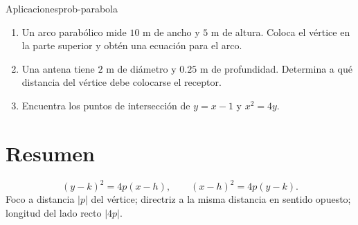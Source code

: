\begin{problem}{Aplicaciones}{prob-parabola}
\begin{enumerate}
  \item Un arco parabólico mide $10$ m de ancho y $5$ m de altura. Coloca el
  vértice en la parte superior y obtén una ecuación para el arco.
  \item Una antena tiene $2$ m de diámetro y $0.25$ m de profundidad.
  Determina a qué distancia del vértice debe colocarse el receptor.
  \item Encuentra los puntos de intersección de $y=x-1$ y $x^2=4y$.
\end{enumerate}
\end{problem}

\section*{Resumen}
\begin{properties}
\[
(y-k)^2=4p(x-h),\qquad (x-h)^2=4p(y-k).
\]
Foco a distancia $|p|$ del vértice; directriz a la misma distancia en sentido
opuesto; longitud del lado recto $|4p|$.
\end{properties}
